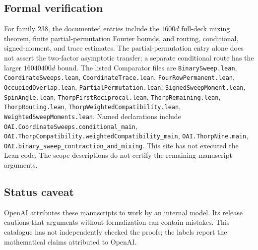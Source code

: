 \documentclass[11pt]{article}
\begin{document}
\subsection{Formal verification}
For family 238, the documented entries include the $1600d$ full-deck mixing theorem, finite partial-permutation Fourier bounds, and routing, conditional, signed-moment, and trace estimates. The partial-permutation entry alone does not assert the two-factor asymptotic transfer; a separate conditional route has the larger $16040400d$ bound. The listed Comparator files are \texttt{BinarySweep.lean}, \texttt{CoordinateSweeps.lean}, \texttt{CoordinateTrace.lean}, \texttt{FourRowPermanent.lean}, \texttt{OccupiedOverlap.lean}, \texttt{PartialPermutation.lean}, \texttt{SignedSweepMoment.lean}, \texttt{SpinAngle.lean}, \texttt{ThorpFirstReciprocal.lean}, \texttt{ThorpRemaining.lean}, \texttt{ThorpRouting.lean}, \texttt{ThorpWeightedCompatibility.lean}, \texttt{WeightedSweepMoments.lean}. Named declarations include \texttt{OAI.CoordinateSweeps.conditional\_main}, \texttt{OAI.ThorpCompatibility.weightedCompatibility\_main}, \texttt{OAI.ThorpNine.main}, \texttt{OAI.binary\_sweep\_contraction\_and\_mixing}. This site has not executed the Lean code. The scope descriptions do not certify the remaining manuscript arguments.

\subsection{Status caveat}
OpenAI attributes these manuscripts to work by an internal model. Its release cautions that arguments without formalization can contain mistakes. This catalogue has not independently checked the proofs; the labels report the mathematical claims attributed to OpenAI.
\end{document}
